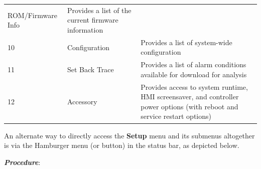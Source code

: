 \begin{longtable}[]{@{}lll@{}}
\begin{minipage}[t]{0.23\columnwidth}
ROM/Firmware Info\strut
\end{minipage} & \begin{minipage}[t]{0.65\columnwidth}\raggedright
Provides a list of the current firmware information\strut
\end{minipage}\tabularnewline
\begin{minipage}[t]{0.04\columnwidth}\raggedright
10\strut
\end{minipage} & \begin{minipage}[t]{0.23\columnwidth}\raggedright
Configuration\strut
\end{minipage} & \begin{minipage}[t]{0.65\columnwidth}\raggedright
Provides a list of system-wide configuration\strut
\end{minipage}\tabularnewline
\begin{minipage}[t]{0.04\columnwidth}\raggedright
11\strut
\end{minipage} & \begin{minipage}[t]{0.23\columnwidth}\raggedright
Set Back Trace\strut
\end{minipage} & \begin{minipage}[t]{0.65\columnwidth}\raggedright
Provides a list of alarm conditions available for download for
analysis\strut
\end{minipage}\tabularnewline
\begin{minipage}[t]{0.04\columnwidth}\raggedright
12\strut
\end{minipage} & \begin{minipage}[t]{0.23\columnwidth}\raggedright
Accessory\strut
\end{minipage} & \begin{minipage}[t]{0.65\columnwidth}\raggedright
Provides access to system runtime, HMI screensaver, and controller power
options (with reboot and service restart options)\strut
\end{minipage}\tabularnewline
\bottomrule
\end{longtable}

An alternate way to directly access the \textbf{Setup} menu and its
submenus altogether is via the Hamburger menu (or button) in the status
bar, as depicted below.

\textbf{\emph{Procedure}}:

